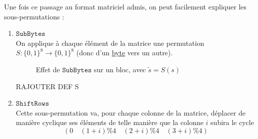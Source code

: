 \documentclass[a4paper, 12pt]{article}
\begin{document}
Une fois ce passage au format matriciel admis, on peut facilement expliquer les sous-permutations : 
\begin{enumerate}
	\item $\mathtt{SubBytes}\label{subbytes}$ \\
		On applique à chaque élément de la matrice une permutation $S: \{0,1\}^8 \rightarrow \{0,1\}^8$ (donc d'un \hyperref[byte]{byte} vers un autre).

		\begin{figure}[h]
		\centering
		\caption{Effet de $\mathtt{SubBytes}$ sur un bloc, avec $\tilde{s} = S(s)$}
		\label{illu_subbyte}
		\end{figure}

		\begin{center}RAJOUTER DEF S\end{center}

	\item $\mathtt{ShiftRows}$\label{shiftrows} \\
		Cette sous-permutation va, pour chaque colonne de la matrice, déplacer de manière cyclique ses éléments de telle manière que la colonne $i$ subira le cycle $$\left(0 \quad (1+i)\%4 \quad (2+i)\%4 \quad (3+i)\%4\right)$$

		\begin{figure}[H]
		\centering
\end{figure}
\end{enumerate}
\end{document}
